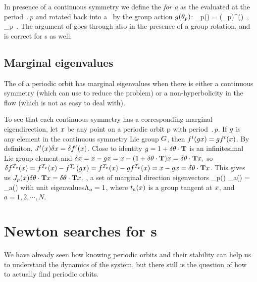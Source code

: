 {In presence of a continuous symmetry we define the
\emph{{\FloquetM} for a \rpo} as the {\jacobianM} evaluated
at the period $\period{p}$ and rotated back into a \po\ by the
group action $g({\bf \theta}_p)$:
    \toCB
\beq
 \jMps_p(\ssp) = \LieEl(\gSpace_p)\jMps^(\ssp)
    \,,\qquad
\ssp  \in \pS_p
\,.
The argument of  goes through also in  
the presence of a group rotation,
and  is correct for \rpo s as well.

\subsection{Marginal eigenvalues}

The {\jacobianM} of a periodic orbit has marginal eigenvalues
when there is either a continuous symmetry (which can use to
reduce the problem) or a non-hyperbolicity in the flow (which
is not as easy to deal with).

To see that each continuous symmetry has a corresponding
marginal eigendirection, let $x$ be any point on a periodic
orbit p with period $\period{p}$. If $g$ is any element in
the continuous symmetry Lie group $G$, then $f^t(g x)
= g f^t(x)$. By definiton, $J^t(x)
\delta x = \delta f^t(x)$.
Close to identity $g = 1+\delta
\theta \cdot \mathbf{T}$ is an infinitesimal Lie group element and
$\delta x = x - g x = x - (1+\delta \theta
\cdot \mathbf{T}) x  = \delta \theta \cdot \mathbf{T} x,$
so
$\delta f^{{T_{p}}}(x) = f^{{T_{p}}}(x) -
f^{{T_{p}}}(g x)= f^{{T_{p}}}(x) - g f^{{T_{p}}}(x) =
x - g x = \delta \theta \cdot \mathbf{T} x$.
This gives us
$J_p(x) \delta \theta \cdot \mathbf{T} x = \delta
\theta \cdot \mathbf{T} x$,
\ie, a set of marginal direction eigenvectors
\beq
 \jMps_p(\ssp) \groupTan_{a}(\ssp) =
\groupTan_{a}(\ssp)
with unit eigenvalues$\Lambda_a=1$,
where $t_{a}(x)$ is a group tangent at $x$, and
$a=1,2,\cdots,N$.


\section{Newton searches for \po s}

We have already seen how knowing periodic orbits and their
stability can help us to understand the dynamics of the
system, but there still is the question of how to actually
find periodic orbits.

}
